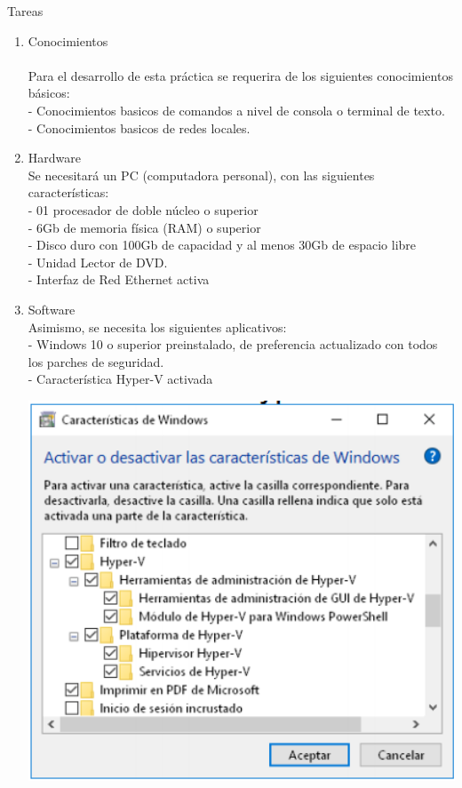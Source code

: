\documentclass[12pt,letterpaper]{article}
\begin{document}
Tareas\\
\begin{enumerate}[1.]
    \item  Conocimientos\\ \\
Para el desarrollo de esta práctica se requerira de los siguientes conocimientos básicos:\\
- Conocimientos basicos de comandos a nivel de consola o terminal de texto.\\
- Conocimientos basicos de redes locales.
     
    \item Hardware\\
Se necesitará un PC (computadora personal), con las siguientes características:\\
- 01 procesador de doble núcleo o superior\\
- 6Gb de memoria física (RAM) o superior\\
- Disco duro con 100Gb de capacidad y al menos 30Gb de espacio libre\\
- Unidad Lector de DVD.\\
- Interfaz de Red Ethernet activa\\
    
    \item Software\\
Asimismo, se necesita los siguientes aplicativos:\\
- Windows 10 o superior preinstalado, de preferencia actualizado con todos los parches de seguridad.\\
- Característica Hyper-V activada\\

    \begin{center}
\includegraphics[width=15cm]{./IMAGENES/img1}
\end{center}


\end{enumerate}
\end{document}
